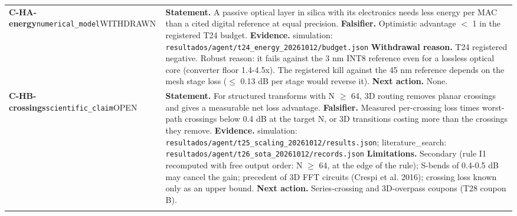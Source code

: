 \begin{longtable}{@{}>{\raggedright\arraybackslash}p{2.35cm}>{\raggedright\arraybackslash}p{13.2cm}@{}}
\textbf{C-HA-energy}\newline \texttt{numerical\_\allowbreak{}model}\newline WITHDRAWN & \textbf{Statement.} A passive optical layer in silica with its electronics needs less energy per MAC than a cited digital reference at equal precision. \newline \textbf{Falsifier.} Optimistic advantage $<$ 1 in the registered T24 budget. \newline \textbf{Evidence.} simulation: \texttt{resultados/\allowbreak{}agent/\allowbreak{}t24\_\allowbreak{}energy\_\allowbreak{}20261012/\allowbreak{}budget.json} \newline \textbf{Withdrawal reason.} T24 registered negative. Robust reason: it fails against the 3 nm INT8 reference even for a lossless optical core (converter floor 1.4-4.5x). The registered kill against the 45 nm reference depends on the mesh stage loss ($\le$ 0.13 dB per stage would reverse it). \newline \textbf{Next action.} None. \\ \addlinespace[2pt]
\textbf{C-HB-crossings}\newline \texttt{scientific\_\allowbreak{}claim}\newline OPEN & \textbf{Statement.} For structured transforms with N $\ge$ 64, 3D routing removes planar crossings and gives a measurable net loss advantage. \newline \textbf{Falsifier.} Measured per-crossing loss times worst-path crossings below 0.4 dB at the target N, or 3D transitions costing more than the crossings they remove. \newline \textbf{Evidence.} simulation: \texttt{resultados/\allowbreak{}agent/\allowbreak{}t25\_\allowbreak{}scaling\_\allowbreak{}20261012/\allowbreak{}results.json}; literature\_\allowbreak{}search: \texttt{resultados/\allowbreak{}agent/\allowbreak{}t26\_\allowbreak{}sota\_\allowbreak{}20261012/\allowbreak{}records.json} \newline \textbf{Limitations.} Secondary (rule I1 recomputed with free output order: N $\ge$ 64, at the edge of the rule); S-bends of 0.4-0.5 dB may cancel the gain; precedent of 3D FFT circuits (Crespi et al. 2016); crossing loss known only as an upper bound. \newline \textbf{Next action.} Series-crossing and 3D-overpass coupons (T28 coupon B). \\ \addlinespace[2pt]

\end{longtable}
